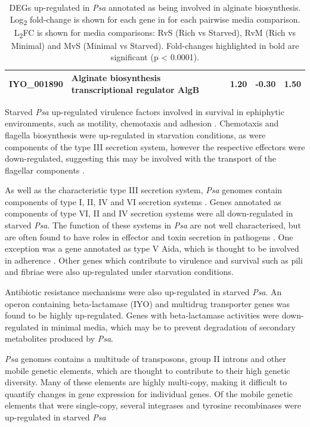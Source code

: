 \begin{table}[H]
\begin{tabular}{p{1.8cm}p{8cm}p{0.8cm}p{0.8cm}p{0.8cm}}
IYO_001890	& Alginate biosynthesis transcriptional regulator AlgB	& \textbf{1.20} & -0.30 & \textbf{1.50}\\
\bottomrule
    \end{tabular}
    \caption[DEGs involved in alginate biosynthesis]{DEGs up-regulated in \textit{Psa} annotated as being involved in alginate biosynthesis. Log\textsubscript{2} fold-change is shown for each gene in for each pairwise media comparison. L\textsubscript{2}FC is shown for media comparisons: RvS (Rich vs Starved), RvM (Rich vs Minimal) and MvS (Minimal vs Starved).  Fold-changes highlighted in bold are significant (p < 0.0001).}
    \label{tab:alginate}
\end{table}

Starved \textit{Psa} up-regulated virulence factors involved in survival in ephiphytic environments, such as motility, chemotaxis and adhesion \citep{Lindow_Andersen_Beattie_1993}. 
Chemotaxis and flagella biosynthesis were up-regulated in starvation conditions, as were components of the type III secretion system, however the respective effectors were down-regulated, suggesting this may be involved with the transport of the flagellar components \citep{Diepold_Armitage_2015}.

As well as the characteristic type III secretion system, \textit{Psa} genomes contain components of type I, II, IV and VI secretion systems \citep{Marcelletti_Ferrante_Petriccione_Firrao_Scortichini_2011}. Genes annotated as components of type VI, II and IV secretion systems were all down-regulated in starved \textit{Psa}. The function of these systems in \textit{Psa} are not well characterised, but are often found to have roles in effector and toxin secretion in pathogens \citep{Records_Gross_2010,Marcelletti_Ferrante_Petriccione_Firrao_Scortichini_2011}. One exception was a gene annotated as type V Aida, which is thought to be involved in adherence \citep{Henderson_2004}. Other genes which contribute to virulence and survival such as pili and fibriae were also up-regulated under starvation conditions. 

Antibiotic resistance mechanisms were also up-regulated in starved \textit{Psa}. An operon containing beta-lactamase (IYO) and multidrug transporter genes was found to be highly up-regulated. Genes with beta-lactamase activities were down-regulated in minimal media, which may be to prevent degradation of secondary metabolites produced by \textit{Psa}.

\textit{Psa} genomes contains a multitude of transposons, group II introns and other mobile genetic elements, which are thought to contribute to their high genetic diversity. Many of these elements are highly multi-copy, making it difficult to quantify changes in gene expression for individual genes. Of the mobile genetic elements that were single-copy, several integrases and tyrosine recombinases were up-regulated in starved \textit{Psa}
